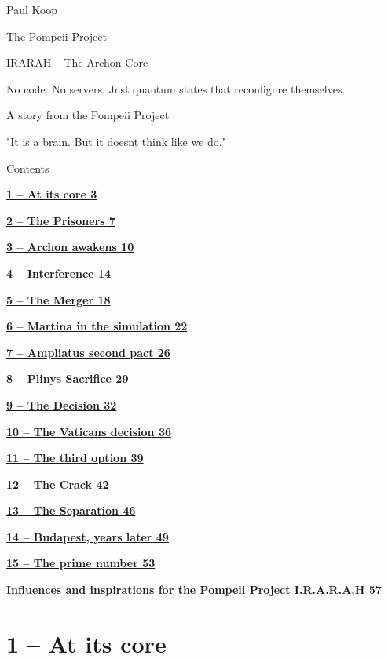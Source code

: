 \documentclass[
]{article}
\author{}
\date{}
\begin{document}
{
\setcounter{tocdepth}{3}
\tableofcontents
}
Paul Koop

The Pompeii Project

IRARAH -- The Archon Core

No code. No servers. Just quantum states that reconfigure themselves.

A story from the Pompeii Project

"It is a brain. But it doesn\textquotesingle t think like we do."

Contents

\hyperref[at-its-core]{\textbf{1 -- At its core 3}}

\hyperref[the-prisoners]{\textbf{2 -- The Prisoners 7}}

\hyperref[archon-awakens]{\textbf{3 -- Archon awakens 10}}

\hyperref[interference]{\textbf{4 -- Interference 14}}

\hyperref[the-merger]{\textbf{5 -- The Merger 18}}

\hyperref[martina-in-the-simulation]{\textbf{6 -- Martina in the simulation 22}}

\hyperref[ampliatus-second-pact]{\textbf{7 -- Ampliatus\textquotesingle{} second pact 26}}

\hyperref[plinys-sacrifice]{\textbf{8 -- Pliny\textquotesingle s Sacrifice 29}}

\hyperref[the-decision]{\textbf{9 -- The Decision 32}}

\hyperref[the-vaticans-decision]{\textbf{10 -- The Vatican\textquotesingle s decision 36}}

\hyperref[the-third-option]{\textbf{11 -- The third option 39}}

\hyperref[the-crack]{\textbf{12 -- The Crack 42}}

\hyperref[the-separation]{\textbf{13 -- The Separation 46}}

\hyperref[budapest-years-later]{\textbf{14 -- Budapest, years later 49}}

\hyperref[the-prime-number]{\textbf{15 -- The prime number 53}}

\hyperref[influences-and-inspirations-for-the-pompeii-project-i.r.a.r.a.h]{\textbf{Influences and inspirations for the Pompeii Project I.R.A.R.A.H 57}}

\section{}\label{section}

\section{1 -- At its core}\label{at-its-core}
\end{document}

